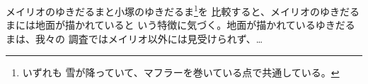 

\showversion
メイリオのゆきだるまと小塚のゆきだるま\footnote{いずれも
雪が降っていて、マフラーを巻いている点で共通している。}を
比較すると、メイリオのゆきだるまには地面が描かれていると
いう特徴に気づく。地面が描かれているゆきだるまは、我々の
調査ではメイリオ以外には見受けられず、…

